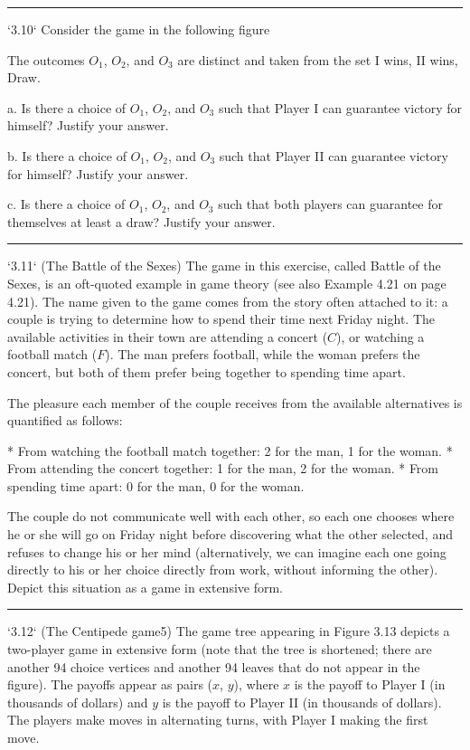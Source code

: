 \documentclass[10pt]{report}
\begin{document}
\vspace{0.5cm}
\hrule
\vspace{0.5cm}
`3.10` Consider the game in the following figure

The outcomes $O_{1}$, $O_{2}$, and $O_{3}$ are distinct and taken from the set {I wins, II wins, Draw}.

a. Is there a choice of $O_{1}$, $O_{2}$, and $O_{3}$ such that Player I can guarantee victory for himself? Justify your answer.

b. Is there a choice of $O_{1}$, $O_{2}$, and $O_{3}$ such that Player II can guarantee victory for himself? Justify your answer.

c. Is there a choice of $O_{1}$, $O_{2}$, and $O_{3}$ such that both players can guarantee for themselves at least a draw? Justify your answer.

\vspace{0.5cm}
\hrule
\vspace{0.5cm}
`3.11` (The Battle of the Sexes) The game in this exercise, called Battle of the Sexes, is an oft-quoted example in game theory (see also Example 4.21 on page 4.21). The name given to the game comes from the story often attached to it: a couple is trying to determine how to spend their time next Friday night. The available activities in their town are attending a concert ($C$), or watching a football match ($F$). The man prefers football, while the woman prefers the concert, but both of them prefer being together to spending time apart.

The pleasure each member of the couple receives from the available alternatives is quantified as follows:

* From watching the football match together: 2 for the man, 1 for the woman.
* From attending the concert together: 1 for the man, 2 for the woman.
* From spending time apart: 0 for the man, 0 for the woman.

The couple do not communicate well with each other, so each one chooses where he or she will go on Friday night before discovering what the other selected, and refuses to change his or her mind (alternatively, we can imagine each one going directly to his or her choice directly from work, without informing the other). Depict this situation as a game in extensive form.

\vspace{0.5cm}
\hrule
\vspace{0.5cm}
`3.12` (The Centipede game5) The game tree appearing in Figure 3.13 depicts a two-player game in extensive form (note that the tree is shortened; there are another 94 choice vertices and another 94 leaves that do not appear in the figure). The payoffs appear as pairs ($x$, $y$), where $x$ is the payoff to Player I (in thousands of dollars) and $y$ is the payoff to Player II (in thousands of dollars). The players make moves in alternating turns, with Player I making the first move.
\end{document}
